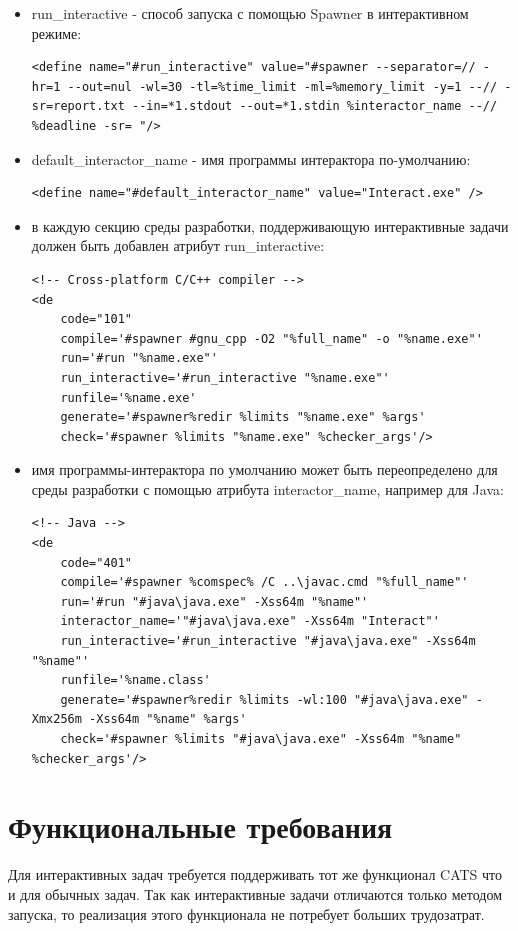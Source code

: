 \documentclass{imcs}
\begin{document}
\begin{itemize}
\item{ run\_interactive - способ запуска с помощью Spawner в интерактивном режиме:
\begin{lstlisting}
<define name="#run_interactive" value="#spawner --separator=// -hr=1 --out=nul -wl=30 -tl=%time_limit -ml=%memory_limit -y=1 --// -sr=report.txt --in=*1.stdout --out=*1.stdin %interactor_name --// %deadline -sr= "/>
\end{lstlisting}
}
\item{ default\_interactor\_name - имя программы интерактора по-умолчанию:
\begin{lstlisting}
<define name="#default_interactor_name" value="Interact.exe" />
\end{lstlisting}
}
\item{ в каждую секцию среды разработки, поддерживающую интерактивные задачи должен быть добавлен атрибут run\_interactive:
\begin{lstlisting}
<!-- Cross-platform C/C++ compiler -->
<de
    code="101"
    compile='#spawner #gnu_cpp -O2 "%full_name" -o "%name.exe"'
    run='#run "%name.exe"'
    run_interactive='#run_interactive "%name.exe"'
    runfile='%name.exe'
    generate='#spawner%redir %limits "%name.exe" %args'
    check='#spawner %limits "%name.exe" %checker_args'/>
\end{lstlisting}
}
\item{ имя программы-интерактора по умолчанию может быть переопределено для среды разработки с помощью атрибута interactor\_name, например для Java:
\begin{lstlisting}
<!-- Java -->
<de
    code="401"
    compile='#spawner %comspec% /C ..\javac.cmd "%full_name"'
    run='#run "#java\java.exe" -Xss64m "%name"'
    interactor_name='"#java\java.exe" -Xss64m "Interact"'
    run_interactive='#run_interactive "#java\java.exe" -Xss64m "%name"'
    runfile='%name.class'
    generate='#spawner%redir %limits -wl:100 "#java\java.exe" -Xmx256m -Xss64m "%name" %args'
    check='#spawner %limits "#java\java.exe" -Xss64m "%name" %checker_args'/>
\end{lstlisting}
}
\end{itemize}


\section{Функциональные требования}

Для интерактивных задач требуется поддерживать тот же функционал CATS что и для обычных задач\cite{rozhkov}. Так как интерактивные задачи отличаются только методом запуска, то реализация этого функционала не потребует больших трудозатрат.
\end{document}

